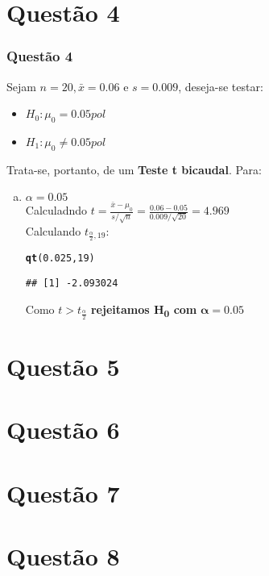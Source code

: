 \documentclass{beamer}\usepackage[]{graphicx}\usepackage[]{color}
\makeatletter
\newcommand{\hlnum}[1]{\textcolor[rgb]{0.686,0.059,0.569}{#1}}%
\newcommand{\hlstd}[1]{\textcolor[rgb]{0.345,0.345,0.345}{#1}}%
\newcommand{\hlkwd}[1]{\textcolor[rgb]{0.737,0.353,0.396}{\textbf{#1}}}%
\newenvironment{kframe}{%
 \def\at@end@of@kframe{}%
 \ifinner\ifhmode%
  \def\at@end@of@kframe{\end{minipage}}%
  \begin{minipage}{\columnwidth}%
 \fi\fi%
 \def\FrameCommand##1{\hskip\@totalleftmargin \hskip-\fboxsep
 \colorbox{shadecolor}{##1}\hskip-\fboxsep
     \hskip-\linewidth \hskip-\@totalleftmargin \hskip\columnwidth}%
 \MakeFramed {\advance\hsize-\width
   \@totalleftmargin\z@ \linewidth\hsize
   \@setminipage}}%
 {\par\unskip\endMakeFramed%
 \at@end@of@kframe}
\newenvironment{knitrout}{}{} %
\makeatother
\begin{document}
	\section{Questão 4}
	\begin{frame}[fragile]
			\frametitle{Questão 4}
			Sejam $n = 20, \bar{x} = 0.06$ e $s = 0.009$, deseja-se testar:
			\begin{itemize}
				\item $H_{0}:  \mu_{0} = 0.05pol$
				\item $H_{1}:  \mu_{0} \neq 0.05pol$
			\end{itemize}
			Trata-se, portanto, de um \textbf{Teste t bicaudal}.  Para:
			\begin{enumerate}[(a)]
				\item $\alpha = 0.05$\\
				Calculadndo $t = \frac{\bar{x} - \mu_{0}}{s/\sqrt{n}} = \frac{0.06 - 0.05}{0.009/\sqrt{20}} = 4.969$\\
				Calculando $t_{\frac{\alpha}{2},19}$:
\begin{knitrout}
\color{fgcolor}\begin{kframe}
\begin{alltt}
\hlkwd{qt}\hlstd{(}\hlnum{0.025}\hlstd{,}\hlnum{19}\hlstd{)}
\end{alltt}
\begin{verbatim}
## [1] -2.093024
\end{verbatim}
\end{kframe}
\end{knitrout}
                        Como $t > t_{\frac{\alpha}{2}} $ \textbf{rejeitamos H\textsubscript{0} com} $\boldsymbol{\alpha = 0.05}$
			\end{enumerate}
		\end{frame}
	\section{Questão 5}
	\section{Questão 6}
	\section{Questão 7}
	\section{Questão 8}
\end{document}
